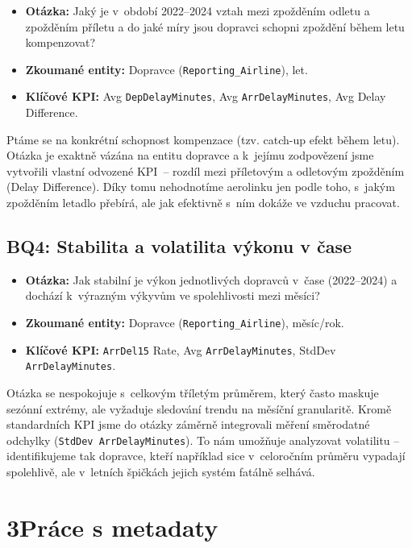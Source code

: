 \documentclass{protokol}
\begin{document}
\begin{itemize}
    \item \textbf{Otázka:} Jaký je v~období 2022--2024 vztah mezi zpožděním odletu a zpožděním příletu a do jaké míry jsou dopravci schopni zpoždění během letu kompenzovat?
    \item \textbf{Zkoumané entity:} Dopravce (\texttt{Reporting\_Airline}), let.
    \item \textbf{Klíčové KPI:} Avg \texttt{DepDelayMinutes}, Avg \texttt{ArrDelayMinutes}, Avg Delay Difference.
\end{itemize}

Ptáme se na konkrétní schopnost kompenzace (tzv. catch-up efekt během letu). Otázka je exaktně vázána na entitu dopravce a k~jejímu zodpovězení jsme vytvořili vlastní odvozené KPI~-- rozdíl mezi příletovým a odletovým zpožděním (Delay Difference). Díky tomu nehodnotíme aerolinku jen podle toho, s~jakým zpožděním letadlo přebírá, ale jak efektivně s~ním dokáže ve vzduchu pracovat.

\subsection{BQ4: Stabilita a volatilita výkonu v čase}

\begin{itemize}
    \item \textbf{Otázka:} Jak stabilní je výkon jednotlivých dopravců v~čase (2022--2024) a dochází k~výrazným výkyvům ve spolehlivosti mezi měsíci?
    \item \textbf{Zkoumané entity:} Dopravce (\texttt{Reporting\_Airline}), měsíc/rok.
    \item \textbf{Klíčové KPI:} \texttt{ArrDel15} Rate, Avg \texttt{ArrDelayMinutes}, StdDev \texttt{ArrDelayMinutes}.
\end{itemize}

Otázka se nespokojuje s~celkovým tříletým průměrem, který často maskuje sezónní extrémy, ale vyžaduje sledování trendu na měsíční granularitě. Kromě standardních KPI jsme do otázky záměrně integrovali měření směrodatné odchylky (\texttt{StdDev ArrDelayMinutes}). To nám umožňuje analyzovat volatilitu -- identifikujeme tak dopravce, kteří například sice v~celoročním průměru vypadají spolehlivě, ale v~letních špičkách jejich systém fatálně selhává.

\section{3\quad Práce s metadaty}
\end{document}

